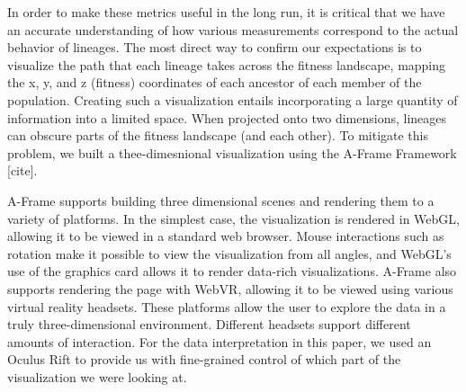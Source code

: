 \documentclass[letterpaper]{article}
\begin{document}

In order to make these metrics useful in the long run, it is critical that we have an accurate understanding of how various measurements correspond to the actual behavior of lineages. The most direct way to confirm our expectations is to visualize the path that each lineage takes across the fitness landscape, mapping the x, y, and z (fitness) coordinates of each ancestor of each member of the population. Creating such a visualization entails incorporating a large quantity of information into a limited space. When projected onto two dimensions, lineages can obscure parts of the fitness landscape (and each other). To mitigate this problem, we built a thee-dimesnional visualization using the A-Frame Framework [cite].

A-Frame supports building three dimensional scenes and rendering them to a variety of platforms. In the simplest case, the visualization is rendered in WebGL, allowing it to be viewed in a standard web browser. Mouse interactions such as rotation make it possible to view the visualization from all angles, and WebGL's use of the graphics card allows it to render data-rich visualizations. A-Frame also supports rendering the page with WebVR, allowing it to be viewed using various virtual reality headsets. These platforms allow the user to explore the data in a truly three-dimensional environment. Different headsets support different amounts of interaction. For the data interpretation in this paper, we used an Oculus Rift to provide us with fine-grained control of which part of the visualization we were looking at.
\end{document}
